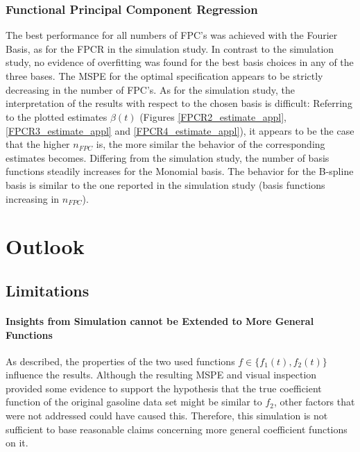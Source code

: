 \documentclass[11pt,twoside,a4paper]{article}
\begin{document}
		\subsubsection{Functional Principal Component Regression}
		The best performance for all numbers of FPC's was achieved with the Fourier Basis, as for the FPCR in the simulation study. In contrast to the simulation study, no evidence of overfitting was found for the best basis choices in any of the three bases. The MSPE for the optimal specification appears to be strictly decreasing in the number of FPC's. As for the simulation study, the interpretation of the results with respect to the chosen basis is difficult: Referring to the plotted estimates $\hat{\beta}(t)$ (Figures \ref{FPCR2_estimate_appl}, \ref{FPCR3_estimate_appl} and \ref{FPCR4_estimate_appl}), it appears to be the case that the higher $n_{FPC}$ is, the more similar the behavior of the corresponding estimates becomes. Differing from the simulation study, the number of basis functions steadily increases for the Monomial basis. The behavior for the B-spline basis is similar to the one reported in the simulation study (basis functions increasing in $n_{FPC}$). 
	

	\section{Outlook}\label{Outlook}
	
	\subsection*{Limitations}
	
	\paragraph{Insights from Simulation cannot be Extended to More General Functions}
	As described, the properties of the two used functions $f \in \{f_1(t), f_2(t)\}$ influence the results. Although the resulting MSPE and visual inspection provided some evidence to support the hypothesis that the true coefficient function of the original gasoline data set might be similar to $f_2$, other factors that were not addressed could have caused this. Therefore, this simulation is not sufficient to base reasonable claims concerning more general coefficient functions on it.
	\vspace{-0.2cm}
	
\end{document}
